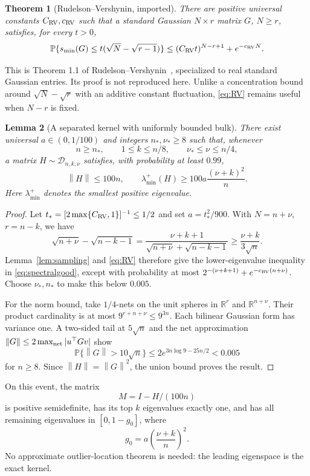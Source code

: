 \documentclass[11pt]{article}
\numberwithin{equation}{section}
\newtheorem{theorem}{Theorem}[section]
\newtheorem{lemma}[theorem]{Lemma}
\theoremstyle{remark}\newtheorem{remark}[theorem]{Remark}
\newcommand{\R}{\mathbb R}
\newcommand{\Prob}{\mathbb P}
\newcommand{\norm}[1]{\left\lVert #1\right\rVert}
\newcommand{\calD}{\mathcal D}
\begin{document}
\begin{theorem}[Rudelson--Vershynin, imported]\label{thm:RV}
There are positive universal constants $C_{\rm RV},c_{\rm RV}$ such that a standard Gaussian $N\times r$ matrix $G$, $N\ge r$, satisfies, for every $t>0$,
\begin{equation}\label{eq:RV}
\Prob\{s_{\min}(G)\le t(\sqrt N-\sqrt{r-1})\}
\le(C_{\rm RV}t)^{N-r+1}+e^{-c_{\rm RV}N}.
\end{equation}
\end{theorem}
This is Theorem 1.1 of Rudelson--Vershynin~\cite{rv}, specialized to real standard Gaussian entries. Its proof is not reproduced here. Unlike a concentration bound around $\sqrt N-\sqrt r$ with an additive constant fluctuation, \eqref{eq:RV} remains useful when $N-r$ is fixed.

\begin{lemma}[A separated kernel with uniformly bounded bulk]\label{lem:spectral}
There exist universal $a\in(0,1/100)$ and integers $n_*,\nu_*\ge8$ such that, whenever
\[
n\ge n_*,\qquad 1\le k\le n/8,\qquad \nu_*\le\nu\le n/4,
\]
a matrix $H\sim\calD_{n,k,\nu}$ satisfies, with probability at least $0.99$,
\begin{equation}\label{eq:spectralgood}
\norm H\le100n,\qquad
\lambda_{\min}^+(H)\ge100a\frac{(\nu+k)^2}{n}.
\end{equation}
Here $\lambda_{\min}^+$ denotes the smallest positive eigenvalue.
\end{lemma}
\begin{proof}
Let $t_*=[2\max\{C_{\rm RV},1\}]^{-1}\le1/2$ and set $a=t_*^2/900$. With $N=n+\nu$, $r=n-k$, we have
\[
\sqrt{n+\nu}-\sqrt{n-k-1}
=\frac{\nu+k+1}{\sqrt{n+\nu}+\sqrt{n-k-1}}
\ge\frac{\nu+k}{3\sqrt n}.
\]
Lemma~\ref{lem:sampling} and \eqref{eq:RV} therefore give the lower-eigenvalue inequality in \eqref{eq:spectralgood}, except with probability at most
$2^{-(\nu+k+1)}+e^{-c_{\rm RV}(n+\nu)}$. Choose $\nu_*,n_*$ to make this below $0.005$.

For the norm bound, take $1/4$-nets on the unit spheres in $\R^r$ and $\R^{n+\nu}$. Their product cardinality is at most $9^{r+n+\nu}\le9^{3n}$. Each bilinear Gaussian form has variance one. A two-sided tail at $5\sqrt n$ and the net approximation $\norm G\le2\max_{\rm net}|u^\top Gv|$ show
\[
\Prob\{\norm G>10\sqrt n\}\le2e^{3n\log9-25n/2}<0.005
\]
for $n\ge8$. Since $\norm H=\norm G^2$, the union bound proves the result.
\end{proof}
On this event, the matrix
\begin{equation}\label{eq:hardM}
M=I-H/(100n)
\end{equation}
is positive semidefinite, has its top $k$ eigenvalues exactly one, and has all remaining eigenvalues in $[0,1-g_0]$, where
\begin{equation}\label{eq:g0}
g_0=a\left(\frac{\nu+k}{n}\right)^2.
\end{equation}
No approximate outlier-location theorem is needed: the leading eigenspace is the exact kernel.
\end{document}

